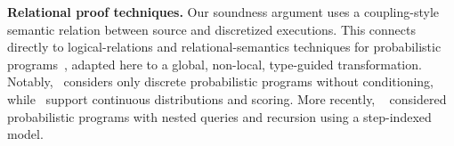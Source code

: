 \smallskip
\noindent\textbf{Relational proof techniques.}
Our soundness argument uses a coupling-style semantic relation between source and discretized executions. This connects directly to logical-relations and relational-semantics techniques for probabilistic programs~\cite{Bizjak2015Step,Wand2018Contextual,Culpepper2017ContextualScoring}, adapted here to a global, non-local, type-guided transformation. Notably,~\cite{Bizjak2015Step} considers only discrete probabilistic programs without conditioning, while~\cite{Wand2018Contextual,Culpepper2017ContextualScoring} support continuous distributions and scoring. More recently, ~\cite{Zhang2022Reasoning} considered probabilistic programs with nested queries and recursion using a step-indexed model.




